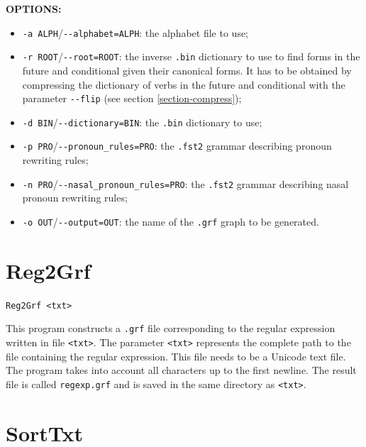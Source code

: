 \bigskip
\noindent \textbf{OPTIONS:}
\begin{itemize}
  \item \verb+-a ALPH+/\verb+--alphabet=ALPH+: the alphabet file to use;

  \item \verb+-r ROOT+/\verb+--root=ROOT+: the inverse \verb+.bin+
  dictionary to use to find forms in the future and conditional given their
  canonical forms. It has to be obtained by compressing the dictionary of verbs
  in the future and conditional with the parameter \verb+--flip+ (see section
  \ref{section-compress});
  
  \item \verb+-d BIN+/\verb+--dictionary=BIN+: the \verb+.bin+ dictionary to use;
  
  \item \verb+-p PRO+/\verb+--pronoun_rules=PRO+: the \verb+.fst2+ grammar
  describing pronoun rewriting rules;
  
  \item \verb+-n PRO+/\verb+--nasal_pronoun_rules=PRO+: the \verb+.fst2+ grammar
  describing nasal pronoun rewriting rules;

  \item \verb+-o OUT+/\verb+--output=OUT+: the name of the \verb+.grf+ graph to
  be generated.
\end{itemize}







\section{Reg2Grf}
\verb+Reg2Grf <txt>+

\bigskip
\noindent {}This 
program constructs a \verb+.grf+ file corresponding to the regular
expression written in file \verb+<txt>+. The parameter \verb+<txt>+ represents the
complete path to the file containing the regular expression. This file needs to
be a Unicode text file. The program takes into account all characters up to the
first newline. The result file is called \verb+regexp.grf+ and is saved in the
same directory as \verb+<txt>+.







\section{SortTxt}


